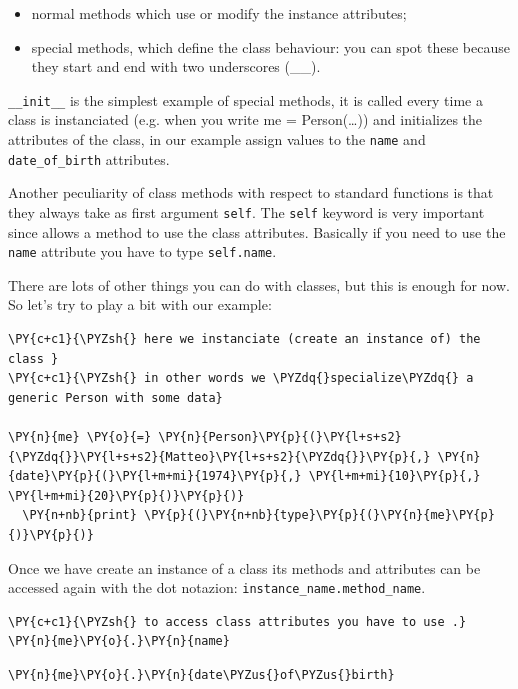 \begin{itemize}
\tightlist
\item normal methods which use or modify the instance attributes;
\item special methods, which define the class behaviour: you can spot these because they start and end with two underscores (\_\_).
\end{itemize}

\texttt{\_\_init\_\_} is the simplest example of special methods, it is called every time a class is instanciated (e.g. when you write me = Person(\ldots{})) and initializes the attributes of the class, in our example assign values to the \texttt{name} and \texttt{date\_of\_birth} attributes.

Another peculiarity of class methods with respect to standard functions is that they always take as first argument \texttt{self}. The \texttt{self} keyword is very important since allows a method to use the class attributes. Basically if you need to use the \texttt{name} attribute you have to type \texttt{self.name}. 

There are lots of other things you can do with classes, but this is enough for now. So let's try to play a bit with our example:

\begin{Verbatim}[commandchars=\\\{\}]
\PY{c+c1}{\PYZsh{} here we instanciate (create an instance of) the class }
\PY{c+c1}{\PYZsh{} in other words we \PYZdq{}specialize\PYZdq{} a generic Person with some data}
        
\PY{n}{me} \PY{o}{=} \PY{n}{Person}\PY{p}{(}\PY{l+s+s2}{\PYZdq{}}\PY{l+s+s2}{Matteo}\PY{l+s+s2}{\PYZdq{}}\PY{p}{,} \PY{n}{date}\PY{p}{(}\PY{l+m+mi}{1974}\PY{p}{,} \PY{l+m+mi}{10}\PY{p}{,} \PY{l+m+mi}{20}\PY{p}{)}\PY{p}{)}
  \PY{n+nb}{print} \PY{p}{(}\PY{n+nb}{type}\PY{p}{(}\PY{n}{me}\PY{p}{)}\PY{p}{)}
\end{Verbatim}

Once we have create an instance of a class its methods and attributes can be accessed again with the dot notazion: \texttt{instance\_name.method\_name}.

\begin{Verbatim}[commandchars=\\\{\}]
\PY{c+c1}{\PYZsh{} to access class attributes you have to use .}
\PY{n}{me}\PY{o}{.}\PY{n}{name}
\end{Verbatim}

\begin{Verbatim}[commandchars=\\\{\}]
\PY{n}{me}\PY{o}{.}\PY{n}{date\PYZus{}of\PYZus{}birth}
\end{Verbatim}

